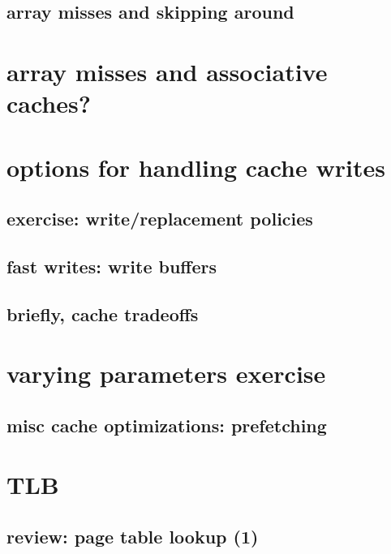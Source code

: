 \subsection{array misses and skipping around}


\section{array misses and associative caches?}


\section{options for handling cache writes}


\subsection{exercise: write/replacement policies}


\subsection{fast writes: write buffers}


\subsection{briefly, cache tradeoffs}


\section{varying parameters exercise}


\subsection{misc cache optimizations: prefetching}


\section{TLB}

\subsection{review: page table lookup (1)}


